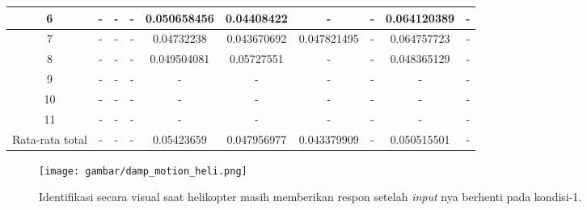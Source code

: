 \begin{table}[H]
{\begin{tabular}{|c|ccccccccc|}
			6 & \multicolumn{1}{c|}{-} & \multicolumn{1}{c|}{-} & \multicolumn{1}{c|}{-} & \multicolumn{1}{c|}{0.050658456} & \multicolumn{1}{c|}{0.04408422} & \multicolumn{1}{c|}{-} & \multicolumn{1}{c|}{-} & \multicolumn{1}{c|}{0.064120389} & - \\ \hline
			7 & \multicolumn{1}{c|}{-} & \multicolumn{1}{c|}{-} & \multicolumn{1}{c|}{-} & \multicolumn{1}{c|}{0.04732238} & \multicolumn{1}{c|}{0.043670692} & \multicolumn{1}{c|}{0.047821495} & \multicolumn{1}{c|}{-} & \multicolumn{1}{c|}{0.064757723} & - \\ \hline
			8 & \multicolumn{1}{c|}{-} & \multicolumn{1}{c|}{-} & \multicolumn{1}{c|}{-} & \multicolumn{1}{c|}{0.049504081} & \multicolumn{1}{c|}{0.05727551} & \multicolumn{1}{c|}{-} & \multicolumn{1}{c|}{-} & \multicolumn{1}{c|}{0.048365129} & - \\ \hline
			9 & \multicolumn{1}{c|}{-} & \multicolumn{1}{c|}{-} & \multicolumn{1}{c|}{-} & \multicolumn{1}{c|}{-} & \multicolumn{1}{c|}{-} & \multicolumn{1}{c|}{-} & \multicolumn{1}{c|}{-} & \multicolumn{1}{c|}{-} & - \\ \hline
			10 & \multicolumn{1}{c|}{-} & \multicolumn{1}{c|}{-} & \multicolumn{1}{c|}{-} & \multicolumn{1}{c|}{-} & \multicolumn{1}{c|}{-} & \multicolumn{1}{c|}{-} & \multicolumn{1}{c|}{-} & \multicolumn{1}{c|}{-} & - \\ \hline
			11 & \multicolumn{1}{c|}{-} & \multicolumn{1}{c|}{-} & \multicolumn{1}{c|}{-} & \multicolumn{1}{c|}{-} & \multicolumn{1}{c|}{-} & \multicolumn{1}{c|}{-} & \multicolumn{1}{c|}{-} & \multicolumn{1}{c|}{-} & - \\ \hline
			Rata-rata total & \multicolumn{1}{c|}{-} & \multicolumn{1}{c|}{-} & \multicolumn{1}{c|}{-} & \multicolumn{1}{c|}{0.05423659} & \multicolumn{1}{c|}{0.047956977} & \multicolumn{1}{c|}{0.043379909} & \multicolumn{1}{c|}{-} & \multicolumn{1}{c|}{0.050515501} & - \\ \hline
		\end{tabular}%
	}
\end{table}

\begin{figure}[H]
	\centering
	\texttt{[image: gambar/damp\_motion\_heli.png]}
	\caption{Identifikasi secara visual saat helikopter masih memberikan respon setelah \textit{input} nya berhenti pada kondisi-1.}
	\label{fig:damp_motion_heli}
\end{figure}


